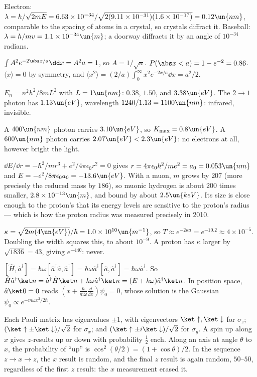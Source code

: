 
 Electron: $\lambda = h/\sqrt{2mE} = 6.63\times10^{-34}/\sqrt{2(9.11\times10^{-31})(1.6\times10^{-17})} = 0.12\un{nm}$, comparable to the spacing of atoms in a crystal, so crystals diffract it. Baseball: $\lambda = h/mv = 1.1\times10^{-34}\un{m}$; a doorway diffracts it by an angle of $10^{-34}$ radians.

 $\int A^2e^{-2\abs x/a}\dd x = A^2a = 1$, so $A = 1/\sqrt a$. $P(\abs x<a) = 1 - e^{-2} = 0.86$. $\langle x\rangle = 0$ by symmetry, and $\langle x^2\rangle = (2/a)\int_0^\infty x^2e^{-2x/a}\dd x = a^2/2$.

 $E_n = n^2h^2/8mL^2$ with $L = 1\un{nm}$: $0.38$, $1.50$, and $3.38\un{eV}$. The $2\to1$ photon has $1.13\un{eV}$, wavelength $1240/1.13 = 1100\un{nm}$: infrared, invisible.

 A $400\un{nm}$ photon carries $3.10\un{eV}$, so $K_{\max} = 0.8\un{eV}$. A $600\un{nm}$ photon carries $2.07\un{eV}<2.3\un{eV}$: no electrons at all, however bright the light.

 $\dd E/\dd r = -\hbar^2/mr^3 + e^2/4\pi\epsilon_0r^2 = 0$ gives $r = 4\pi\epsilon_0\hbar^2/me^2 = a_0 = 0.053\un{nm}$ and $E = -e^2/8\pi\epsilon_0a_0 = -13.6\un{eV}$. With a muon, $m$ grows by $207$ (more precisely the reduced mass by $186$), so muonic hydrogen is about $200$ times smaller, $2.8\times10^{-13}\un{m}$, and bound by about $2.5\un{keV}$. Its size is close enough to the proton's that its energy levels are sensitive to the proton's radius --- which is how the proton radius was measured precisely in 2010.

 $\kappa = \sqrt{2m(4\un{eV})}/\hbar = 1.0\times10^{10}\un{m^{-1}}$, so $T\approx e^{-2\kappa a} = e^{-10.2}\approx4\times10^{-5}$. Doubling the width squares this, to about $10^{-9}$. A proton has $\kappa$ larger by $\sqrt{1836} = 43$, giving $e^{-440}$: never.

 $[\hat H,\hat a^\dagger] = \hbar\omega[\hat a^\dagger\hat a,\hat a^\dagger] = \hbar\omega\hat a^\dagger[\hat a,\hat a^\dagger] = \hbar\omega\hat a^\dagger$. So $\hat H\hat a^\dagger\ket n = \hat a^\dagger\hat H\ket n + \hbar\omega\hat a^\dagger\ket n = (E+\hbar\omega)\hat a^\dagger\ket n$. In position space, $\hat a\ket0 = 0$ reads $(x + \tfrac{\hbar}{m\omega}\tfrac{\dd}{\dd x})\psi_0 = 0$, whose solution is the Gaussian $\psi_0\propto e^{-m\omega x^2/2\hbar}$.

 Each Pauli matrix has eigenvalues $\pm1$, with eigenvectors $\ket\uparrow,\ket\downarrow$ for $\sigma_z$; $(\ket\uparrow\pm\ket\downarrow)/\sqrt2$ for $\sigma_x$; and $(\ket\uparrow\pm i\ket\downarrow)/\sqrt2$ for $\sigma_y$. A spin up along $x$ gives $z$-results up or down with probability $\tfrac12$ each. Along an axis at angle $\theta$ to $x$, the probability of ``up'' is $\cos^2(\theta/2) = (1+\cos\theta)/2$. In the sequence $z\to x\to z$, the $x$ result is random, and the final $z$ result is again random, $50$--$50$, regardless of the first $z$ result: the $x$ measurement erased it.

